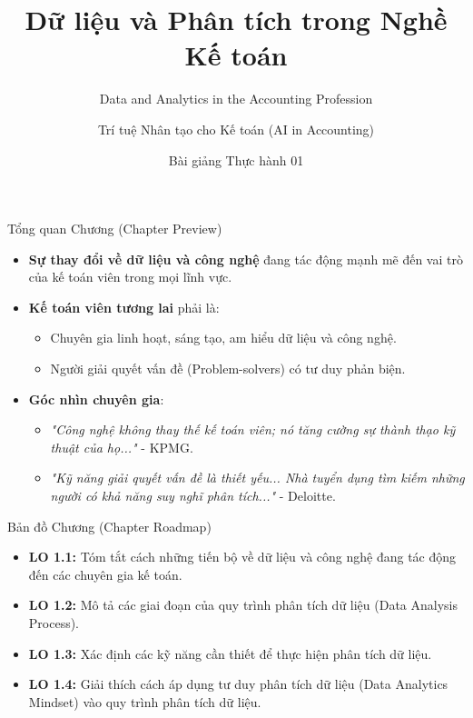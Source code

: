 \documentclass[aspectratio=169,12pt]{beamer}
\title[Thực hành - Chương 1]{Dữ liệu và Phân tích trong Nghề Kế toán}
\subtitle{Data and Analytics in the Accounting Profession}
\author[Giảng viên]{Trí tuệ Nhân tạo cho Kế toán (AI in Accounting)}
\institute[Đại học]{Khoa Kế toán - Kiểm toán}
\date{Bài giảng Thực hành 01}
\begin{document}
\begin{frame}
    \titlepage
\end{frame}

\begin{frame}{Tổng quan Chương (Chapter Preview)}
    \begin{itemize}
        \item \textbf{Sự thay đổi về dữ liệu và công nghệ} đang tác động mạnh mẽ đến vai trò của kế toán viên trong mọi lĩnh vực.
        \item \textbf{Kế toán viên tương lai} phải là:
        \begin{itemize}
            \item Chuyên gia linh hoạt, sáng tạo, am hiểu dữ liệu và công nghệ.
            \item Người giải quyết vấn đề (Problem-solvers) có tư duy phản biện.
        \end{itemize}
        \item \textbf{Góc nhìn chuyên gia}: 
        \begin{itemize}
            \item \textit{"Công nghệ không thay thế kế toán viên; nó tăng cường sự thành thạo kỹ thuật của họ..."} - KPMG.
            \item \textit{"Kỹ năng giải quyết vấn đề là thiết yếu... Nhà tuyển dụng tìm kiếm những người có khả năng suy nghĩ phân tích..."} - Deloitte.
        \end{itemize}
    \end{itemize}
\end{frame}

\begin{frame}{Bản đồ Chương (Chapter Roadmap)}
    \begin{itemize}
        \item \textbf{LO 1.1:} Tóm tắt cách những tiến bộ về dữ liệu và công nghệ đang tác động đến các chuyên gia kế toán.
        \item \textbf{LO 1.2:} Mô tả các giai đoạn của quy trình phân tích dữ liệu (Data Analysis Process).
        \item \textbf{LO 1.3:} Xác định các kỹ năng cần thiết để thực hiện phân tích dữ liệu.
        \item \textbf{LO 1.4:} Giải thích cách áp dụng tư duy phân tích dữ liệu (Data Analytics Mindset) vào quy trình phân tích dữ liệu.
    \end{itemize}
\end{frame}
\end{document}
